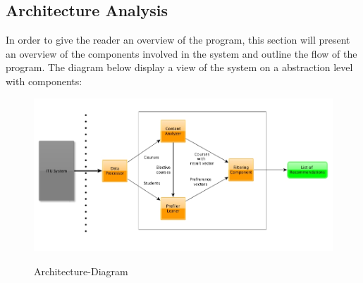 

\subsection{Architecture Analysis}
In order to give the reader an overview of the program, this section will present an overview of the components involved in the system and outline the flow of the program. The diagram below display a view of the system on a abstraction level with components: 

\begin{figure}[H]
\centering
\includegraphics[scale=0.5]{Pictures/Architecture-Diagram.jpg}
\label{Architecture-Diagram}
\caption{Architecture-Diagram}
\end{figure}


